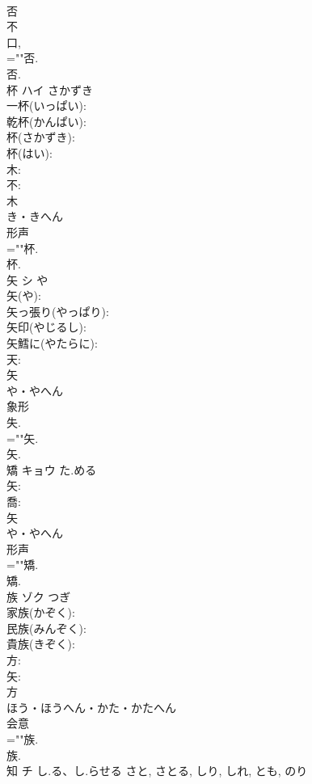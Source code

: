 \documentclass[8pt]{extreport}
\begin{document}
\begin{CJK}{UTF8}{min}
\\	否 
\\	不 
\\	口, 
\\	=""否.
\\	否.
\\	杯	ハイ	さかずき		
\\	一杯(いっぱい): 
\\	乾杯(かんぱい): 
\\	杯(さかずき): 
\\	杯(はい): 
\\	木: 
\\	不: 
\\	木	
\\	き・きへん	
\\	形声 
\\	=""杯.
\\	杯.
\\	矢	シ	や		
\\	矢(や): 
\\	矢っ張り(やっぱり): 
\\	矢印(やじるし): 
\\	矢鱈に(やたらに): 
\\	天: 
\\	矢	
\\	や・やへん	
\\	象形 
\\	失.	
\\	=""矢.
\\	矢.
\\	矯	キョウ	た.める		
\\	矢: 
\\	喬: 
\\	矢	
\\	や・やへん	
\\	形声 
\\	=""矯.
\\	矯.
\\	族	ゾク		つぎ	
\\	家族(かぞく): 
\\	民族(みんぞく): 
\\	貴族(きぞく): 
\\	方: 
\\	矢: 
\\	方	
\\	ほう・ほうへん・かた・かたへん	
\\	会意 
\\	=""族.
\\	族.
\\	知	チ	し.る、し.らせる	さと, さとる, しり, しれ, とも, のり	

\end{CJK}
\end{document}
